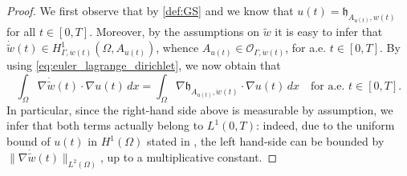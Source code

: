\documentclass[a4paper,11pt,reqno]{amsart}
\numberwithin{equation}{section}
\theoremstyle{definition}
\theoremstyle{remark}
\begin{document}
\begin{proof}
     We first observe that by \ref{def:GS} and  we know that $u(t)=\mathfrak{h}_{A_{u(t)},w(t)}$ for all $t\in [0,T]$. Moreover, by the assumptions on $\widetilde w$ it is easy to infer that $\dot{\widetilde w}(t)\in H^1_{\Gamma,\dot w(t)}(\Omega, A_{u(t)})$, whence $A_{u(t)}\in \mathcal O_{\Gamma,\dot w(t)}$, for a.e. $t\in [0,T]$. By using \eqref{eq:euler_lagrange_dirichlet}, we now obtain that
    \begin{equation}\label{eq:workeqtilde}
        \int_\Omega \nabla \dot{\widetilde w}(t)\cdot \nabla u(t) \, dx=\int_\Omega \nabla \mathfrak{h}_{A_{u(t)},\dot w(t)}\cdot \nabla u(t) \, dx \quad\text{for a.e. $t\in [0,T]$}.
    \end{equation}
    In particular, since the right-hand side above is measurable by assumption, we infer that both terms actually belong to $L^1(0,T)$: indeed, due to the uniform bound of $u(t)$ in $H^1(\Omega)$ stated in , the left hand-side can be bounded by $\|\nabla \dot{\widetilde w}(t)\|_{L^2(\Omega)}$, up to a multiplicative constant.
    

\end{proof}
\end{document}
